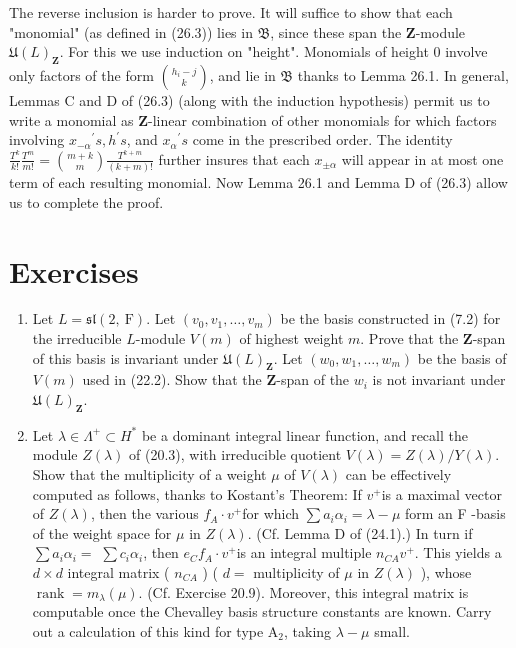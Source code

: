 \documentclass[10pt]{article}
\begin{document}
The reverse inclusion is harder to prove. It will suffice to show that each "monomial" (as defined in (26.3)) lies in $\mathfrak{B}$, since these span the $\mathbf{Z}$-module $\mathfrak{U}(L)_{\mathbf{Z}}$. For this we use induction on "height". Monomials of height 0 involve only factors of the form $\binom{h_{i}-j}{k}$, and lie in $\mathfrak{B}$ thanks to Lemma 26.1. In general, Lemmas C and D of (26.3) (along with the induction hypothesis) permit us to write a monomial as $\mathbf{Z}$-linear combination of other monomials for which factors involving $x_{-\alpha}{ }^{\prime} s, h^{\prime} s$, and $x_{\alpha}{ }^{\prime} s$ come in the prescribed order. The identity $\frac{T^{k}}{k!} \frac{T^{m}}{m!}=\binom{m+k}{m} \frac{T^{k+m}}{(k+m)!}$ further insures that each $x_{ \pm \alpha}$ will appear in at most one term of each resulting monomial. Now Lemma 26.1 and Lemma D of (26.3) allow us to complete the proof.

\section*{Exercises}
\begin{enumerate}
  \item Let $L=\mathfrak{s l}(2, \mathrm{~F})$. Let $\left(v_{0}, v_{1}, \ldots, v_{m}\right)$ be the basis constructed in (7.2) for the irreducible $L$-module $V(m)$ of highest weight $m$. Prove that the $\mathbf{Z}$-span of this basis is invariant under $\mathfrak{U}(L)_{\mathbf{Z}}$. Let $\left(w_{0}, w_{1}, \ldots, w_{m}\right)$ be the basis of $V(m)$ used in (22.2). Show that the $\mathbf{Z}$-span of the $w_{i}$ is not invariant under $\mathfrak{U}(L)_{\mathbf{Z}}$.
  \item Let $\lambda \in \Lambda^{+} \subset H^{*}$ be a dominant integral linear function, and recall the module $Z(\lambda)$ of (20.3), with irreducible quotient $V(\lambda)=Z(\lambda) / Y(\lambda)$. Show that the multiplicity of a weight $\mu$ of $V(\lambda)$ can be effectively computed as follows, thanks to Kostant's Theorem: If $v^{+}$is a maximal vector of $Z(\lambda)$, then the various $f_{A} \cdot v^{+}$for which $\sum a_{i} \alpha_{i}=\lambda-\mu$ form an F -basis of the weight space for $\mu$ in $Z(\lambda)$. (Cf. Lemma D of (24.1).) In turn if $\sum a_{i} \alpha_{i}=$ $\sum c_{i} \alpha_{i}$, then $e_{C} f_{A} \cdot v^{+}$is an integral multiple $n_{C A} v^{+}$. This yields a $d \times d$ integral matrix ( $n_{C A}$ ) ( $d=$ multiplicity of $\mu$ in $Z(\lambda)$ ), whose $\operatorname{rank}=m_{\lambda}(\mu)$. (Cf. Exercise 20.9). Moreover, this integral matrix is computable once the Chevalley basis structure constants are known. Carry out a calculation of this kind for type $\mathrm{A}_{2}$, taking $\lambda-\mu$ small.
\end{enumerate}
\end{document}
